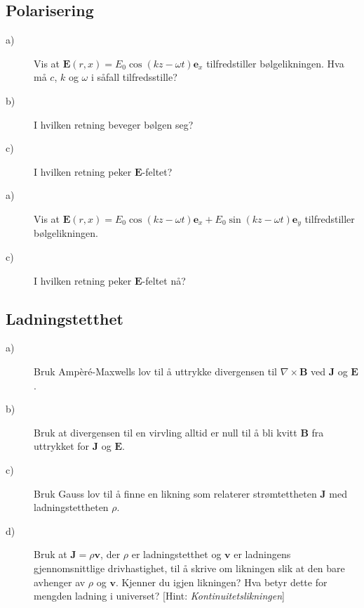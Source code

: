 \documentclass[twoside,utf8]{article}
\begin{document}
\subsection{Polarisering}
\begin{description}
	\item[a)] Vis at $\mathbf{E}(r,x)=E_0\cos(kz-\omega t) \mathbf{e}_x$ tilfredstiller bølgelikningen. Hva må $c$, $k$ og $\omega$ i såfall tilfredsstille?
	\item[b)] I hvilken retning beveger bølgen seg?
	\item[c)] I hvilken retning peker $\mathbf{E}$-feltet?
	\item[a)] Vis at $\mathbf{E}(r,x)=E_0\cos(kz-\omega t) \mathbf{e}_x+E_0\sin(kz-\omega t) \mathbf{e}_y$ tilfredstiller bølgelikningen.
	\item[c)] I hvilken retning peker $\mathbf{E}$-feltet nå?
\end{description}


\subsection{Ladningstetthet}
\begin{description}
	\item[a)] Bruk Ampèré-Maxwells lov til å uttrykke divergensen til $\nabla \times \mathbf{B}$ ved $\mathbf{J}$ og $\mathbf{E}$.
	\item[b)] Bruk at divergensen til en virvling alltid er null til å bli kvitt $\mathbf{B}$ fra uttrykket for $\mathbf{J}$ og $\mathbf{E}$.
	\item[c)] Bruk Gauss lov til å finne en likning som relaterer strømtettheten $\mathbf{J}$ med ladningstettheten $\rho$.
	\item[d)] Bruk at $\mathbf{J}=\rho \mathbf{v}$, der $\rho$ er ladningstetthet og $\mathbf{v}$ er ladningens gjennomsnittlige drivhastighet, til å skrive om likningen slik at den bare avhenger av $\rho$ og $\mathbf{v}$. Kjenner du igjen likningen? Hva betyr dette for mengden ladning i universet?
		[Hint: {\it Kontinuitetslikningen}]
\end{description}
\end{document}

